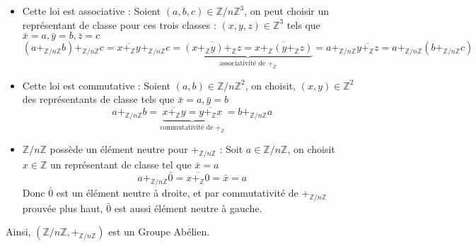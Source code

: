 \documentclass{article}
\renewenvironment{question_kholle}[2][ ]
{
	\subsection{\texorpdfstring{#2}{}}
	\notblank{#1}
	{
		\noindent #1
		\bigbreak
	}
	{}
	\begin{proof}
}
{
	\end{proof}
}
\begin{document}
\begin{question_kholle}
\begin{itemize}[label=$\star$]
\begin{itemize}[label=$\bullet$]
      \item Cette loi est associative : 
      Soient $(a, b, c) \in \mathbb{Z}/n\mathbb{Z}^{3}$, on peut choisir un représentant de classe pour ces trois classes : $(x,y, z) \in \mathbb{Z}^{3}$ tels que $\bar{x} = a, \bar{y} = b, \bar{z} = c$
$$
      (a +_{\mathbb{Z}/n\mathbb{Z}} b)+_{\mathbb{Z}/n\mathbb{Z}} c =  \overline{x+_{\mathbb{Z}}y} +_{\mathbb{Z}/n\mathbb{Z}} c = \underbrace{ \overline{(x+_{\mathbb{Z}}y) +_{\mathbb{Z}} z}= \overline{x+_{\mathbb{Z}}(y+_{\mathbb{Z}}z)} }_{ \text{associativité de }+_{\mathbb{Z}} } =  a +_{\mathbb{Z}/n\mathbb{Z}}\overline{y +_{\mathbb{Z}} z} = a +_{\mathbb{Z}/n\mathbb{Z}} (b +_{\mathbb{Z}/n\mathbb{Z}} c)
$$
      \item Cette loi est commutative :
      Soient $(a, b) \in \mathbb{Z}/n\mathbb{Z}^{2}$, on choisit, $(x, y) \in \mathbb{Z}^{2}$ des représentants de classe tels que $\bar{x} = a, \bar{y} = b$
$$
      a+_{\mathbb{Z}/n\mathbb{Z}}b = \underbrace{ \overline{x +_{\mathbb{Z}} y} = \overline{y+_{\mathbb{Z}}x} }_{ \text{commutativité de } +_{\mathbb{Z}} } = b +_{\mathbb{Z}/n\mathbb{Z}}a
$$
      \item $\mathbb{Z}/n\mathbb{Z}$ possède un élément neutre pour $+_{\mathbb{Z}/n\mathbb{Z}}$ : 
      Soit $a \in \mathbb{Z}/n\mathbb{Z}$, on choisit $x \in \mathbb{Z}$ un représentant de classe tel que $\bar{x} = a$
$$
      a +_{\mathbb{Z}/n\mathbb{Z}} \bar{0} = \overline{x+_{\mathbb{Z}}0} = \bar{x} = a
$$
      Donc $\bar{0}$ est un élément neutre à droite, et par commutativité de $+_{\mathbb{Z}/n\mathbb{Z}}$ prouvée plus haut, $\bar{0}$ est aussi élément neutre à gauche.
    \end{itemize}
    Ainsi, $(\mathbb{Z}/n\mathbb{Z}, +_{\mathbb{Z}/n\mathbb{Z}})$ est un Groupe Abélien.
  \end{itemize}  
\end{question_kholle}
\end{document}
